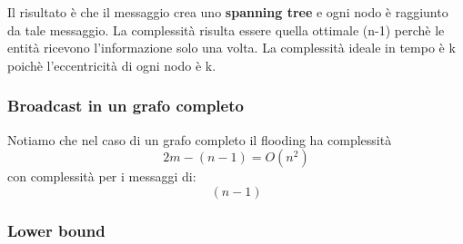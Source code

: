 \documentclass[12pt]{article}
\begin{document}
			Il risultato è che il messaggio crea uno \textbf{spanning tree} e ogni nodo è raggiunto da tale messaggio. La complessità risulta essere quella ottimale (n-1) perchè le entità ricevono l'informazione solo una volta. La complessità ideale in tempo è k poichè l'eccentricità di ogni nodo è k.
		\subsubsection{Broadcast in un grafo completo}
			Notiamo che nel caso di un grafo completo il flooding ha complessità 
			$$2m-(n-1)=O(n^{2}) $$ con complessità per i messaggi di:
			$$(n-1) $$
		\subsubsection{Lower bound}
	
		
		
		
			
		


	

	
	
	
	
		
		
		
	
		
		 
		
		
		  
			
			
			 
			 
	
		
		
		    
			
			 
			
			
			
		
		
			 
		
			 
			
			
			 
			
		
		
		
				
			
				
				
			
		
		
		
		
		
		
		
		
		
		
		
		
		
		
		
		
		
		
		
		
		
		
		
		
		
		
		
		
\end{document}
